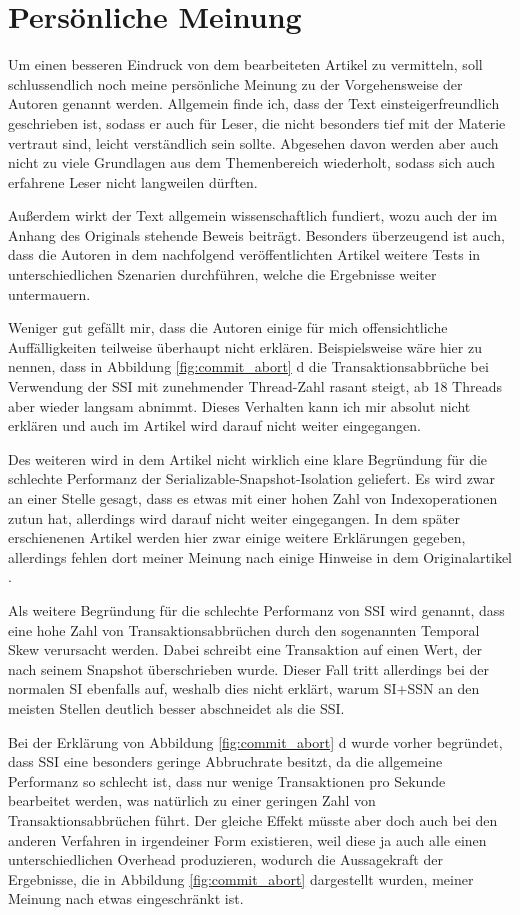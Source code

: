 \section{Persönliche Meinung}
\label{sec:persoenliche_meinung}

Um einen besseren Eindruck von dem bearbeiteten Artikel zu vermitteln, soll schlussendlich noch meine persönliche Meinung zu der Vorgehensweise der Autoren genannt werden.
Allgemein finde ich, dass der Text einsteigerfreundlich geschrieben ist, sodass er auch für Leser, die nicht besonders tief mit der Materie vertraut sind, leicht verständlich sein sollte.
Abgesehen davon werden aber auch nicht zu viele Grundlagen aus dem Themenbereich wiederholt, sodass sich auch erfahrene Leser nicht langweilen dürften.

Außerdem wirkt der Text allgemein wissenschaftlich fundiert, wozu auch der im Anhang des Originals stehende Beweis beiträgt.
Besonders überzeugend ist auch, dass die Autoren in dem nachfolgend veröffentlichten Artikel \cite{WangJFP16} weitere Tests in unterschiedlichen Szenarien durchführen, welche die Ergebnisse weiter untermauern.

Weniger gut gefällt mir, dass die Autoren einige für mich offensichtliche Auffälligkeiten teilweise überhaupt nicht erklären.
Beispielsweise wäre hier zu nennen, dass in Abbildung \ref{fig:commit_abort} d die Transaktionsabbrüche bei Verwendung der SSI mit zunehmender Thread-Zahl rasant steigt, ab 18 Threads aber wieder langsam abnimmt.
Dieses Verhalten kann ich mir absolut nicht erklären und auch im Artikel wird darauf nicht weiter eingegangen.

Des weiteren wird in dem Artikel nicht wirklich eine klare Begründung für die schlechte Performanz der Serializable-Snapshot-Isolation geliefert.
Es wird zwar an einer Stelle gesagt, dass es etwas mit einer hohen Zahl von Indexoperationen zutun hat, allerdings wird darauf nicht weiter eingegangen.
In dem später erschienenen Artikel \cite{WangJFP16} werden hier zwar einige weitere Erklärungen gegeben, allerdings fehlen dort meiner Meinung nach einige Hinweise in dem Originalartikel \cite{Wang:2015}.

Als weitere Begründung für die schlechte Performanz von SSI wird genannt, dass eine hohe Zahl von Transaktionsabbrüchen durch den sogenannten Temporal Skew verursacht werden.
Dabei schreibt eine Transaktion auf einen Wert, der nach seinem Snapshot überschrieben wurde. 
Dieser Fall tritt allerdings bei der normalen SI ebenfalls auf, weshalb dies nicht erklärt, warum SI+SSN an den meisten Stellen deutlich besser abschneidet als die SSI.

Bei der Erklärung von Abbildung \ref{fig:commit_abort} d wurde vorher begründet, dass SSI eine besonders geringe Abbruchrate besitzt, da die allgemeine Performanz so schlecht ist, dass nur wenige Transaktionen pro Sekunde bearbeitet werden, was natürlich zu einer geringen Zahl von Transaktionsabbrüchen führt.
Der gleiche Effekt müsste aber doch auch bei den anderen Verfahren in irgendeiner Form existieren, weil diese ja auch alle einen unterschiedlichen Overhead produzieren, wodurch die Aussagekraft der Ergebnisse, die in Abbildung \ref{fig:commit_abort} dargestellt wurden, meiner Meinung nach etwas eingeschränkt ist.